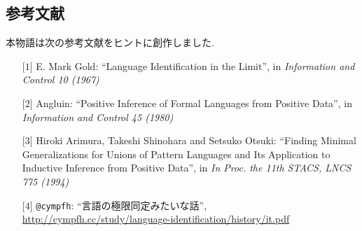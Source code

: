 \subsection*{参考文献}

本物語は次の参考文献をヒントに創作しました.

\begin{enumerate}
    \item[$\lbrack 1 \rbrack$] E. Mark Gold: ``Language Identification in the Limit'', in \emph{Information and Control 10 (1967)}
    \item[$\lbrack 2 \rbrack$] Angluin: ``Positive Inference of Formal Languages from Positive Data'', in \emph{Information and Control 45 (1980)}
    \item[$\lbrack 3 \rbrack$] {Hiroki Arimura, Takeshi Shinohara and Setsuko Otsuki}: ``{Finding Minimal Generalizations for Unions of Pattern Languages and Its Application to Inductive Inference from Positive Data}'', in \emph{In Proc. the 11th STACS, LNCS 775 (1994)}
    \item[$\lbrack 4 \rbrack$] {\tt @cympfh}: ``言語の極限同定みたいな話'',\\
        \url{http://cympfh.cc/study/language-identification/history/it.pdf}
\end{enumerate}
